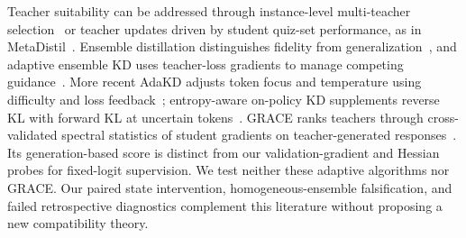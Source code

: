 Teacher suitability can be addressed through instance-level multi-teacher selection~\citep{yuan2021selection} or teacher updates driven by student quiz-set performance, as in MetaDistil~\citep{zhou2022metadistil}. Ensemble distillation distinguishes fidelity from generalization~\citep{stanton2021really}, and adaptive ensemble KD uses teacher-loss gradients to manage competing guidance~\citep{du2020agree}. More recent AdaKD adjusts token focus and temperature using difficulty and loss feedback~\citep{xie2026adakd}; entropy-aware on-policy KD supplements reverse KL with forward KL at uncertain tokens~\citep{jin2026entropy}. GRACE ranks teachers through cross-validated spectral statistics of student gradients on teacher-generated responses~\citep{panigrahi2026grace}. Its generation-based score is distinct from our validation-gradient and Hessian probes for fixed-logit supervision. We test neither these adaptive algorithms nor GRACE. Our paired state intervention, homogeneous-ensemble falsification, and failed retrospective diagnostics complement this literature without proposing a new compatibility theory.
